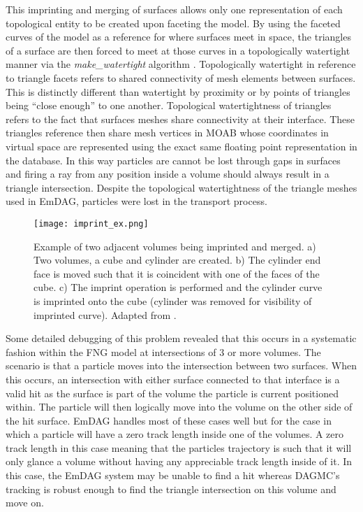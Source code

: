This imprinting and merging of surfaces allows only one representation of each
topological entity to be created upon faceting the model. By using the faceted
curves of the model as a reference for where surfaces meet in space, the
triangles of a surface are then forced to meet at those curves in a
topologically watertight manner via the \textit{make\_watertight} algorithm
\cite{Smith_2011}. Topologically watertight in reference to triangle facets
refers to shared connectivity of mesh elements between surfaces. This is
distinctly different than watertight by proximity or by points of triangles
being ``close enough'' to one another. Topological watertightness of triangles
refers to the fact that surfaces meshes share connectivity at their
interface. These triangles reference then share mesh vertices in MOAB whose
coordinates in virtual space are represented using the exact same floating point
representation in the database.  In this way particles are cannot be lost
through gaps in surfaces and firing a ray from any position inside a volume
should always result in a triangle intersection. Despite the topological
watertightness of the triangle meshes used in EmDAG, particles were lost in the
transport process.

\begin{figure}[H]
  \centering
  \texttt{[image: imprint\_ex.png]}
  \caption{Example of two adjacent volumes being imprinted and merged. a) Two
    volumes, a cube and cylinder are created. b) The cylinder end face is moved
    such that it is coincident with one of the faces of the cube. c) The imprint
    operation is performed and the cylinder curve is imprinted onto the cube
    (cylinder was removed for visibility of imprinted curve). Adapted from
    \cite{White_2002}.}
  \label{imprint_ex}
\end{figure}

Some detailed debugging of this problem revealed that this occurs in a
systematic fashion within the FNG model at intersections of 3 or more
volumes. The scenario is that a particle moves into the intersection between two
surfaces. When this occurs, an intersection with either surface connected to
that interface is a valid hit as the surface is part of the volume the
particle is current positioned within. The particle will then logically move
into the volume on the other side of the hit surface. EmDAG handles most of
these cases well but for the case in which a particle will have a zero track
length inside one of the volumes. A zero track length in this case meaning that
the particles trajectory is such that it will only glance a volume without
having any appreciable track length inside of it. In this case, the EmDAG system
may be unable to find a hit whereas DAGMC's tracking is robust enough to find
the triangle intersection on this volume and move on.

